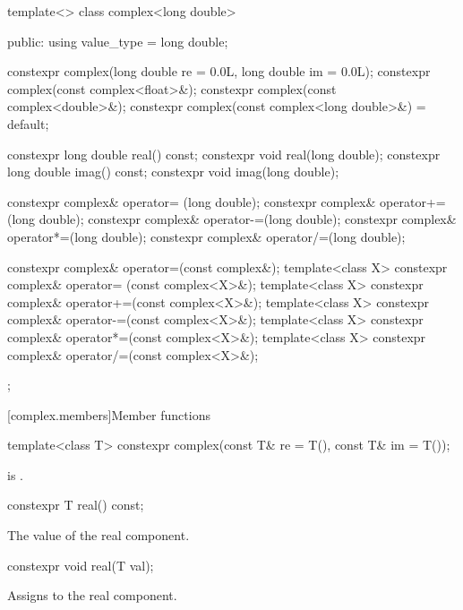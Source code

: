\begin{codeblock}
{  template<> class complex<long double> {
  public:
    using value_type = long double;

    constexpr complex(long double re = 0.0L, long double im = 0.0L);
    constexpr complex(const complex<float>&);
    constexpr complex(const complex<double>&);
    constexpr complex(const complex<long double>&) = default;

    constexpr long double real() const;
    constexpr void real(long double);
    constexpr long double imag() const;
    constexpr void imag(long double);

    constexpr complex& operator= (long double);
    constexpr complex& operator+=(long double);
    constexpr complex& operator-=(long double);
    constexpr complex& operator*=(long double);
    constexpr complex& operator/=(long double);

    constexpr complex& operator=(const complex&);
    template<class X> constexpr complex& operator= (const complex<X>&);
    template<class X> constexpr complex& operator+=(const complex<X>&);
    template<class X> constexpr complex& operator-=(const complex<X>&);
    template<class X> constexpr complex& operator*=(const complex<X>&);
    template<class X> constexpr complex& operator/=(const complex<X>&);
  };
}
\end{codeblock}

[complex.members]{Member functions}

%
\begin{itemdecl}
template<class T> constexpr complex(const T& re = T(), const T& im = T());
\end{itemdecl}

\begin{itemdescr}
\pnum
\ensures
{} is .
\end{itemdescr}

%
\begin{itemdecl}
constexpr T real() const;
\end{itemdecl}

\begin{itemdescr}
\pnum
\returns
The value of the real component.
\end{itemdescr}

%
\begin{itemdecl}
constexpr void real(T val);
\end{itemdecl}

\begin{itemdescr}
\pnum
\effects
Assigns  to the real component.
\end{itemdescr}

